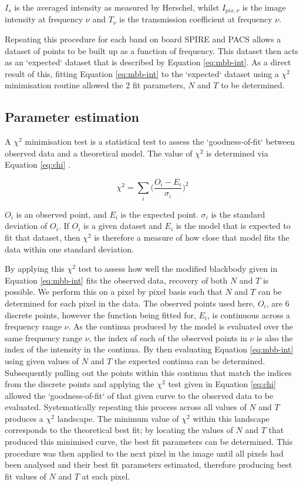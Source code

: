 \documentclass{report}
\begin{document}
$I_{s}$ is the averaged intensity as measured by Herschel, whilst $I_{pix,\nu}$ is the image intensity at frequency $\nu$ and $T_{\nu}$ is the transmission coefficient at frequency $\nu$.

Repeating this procedure for each band on board SPIRE and PACS allows a dataset of points to be built up as a function of frequency. This dataset then acts as an `expected` dataset that is described by Equation \ref{eq:mbb-int}. As a direct result of this, fitting Equation \ref{eq:mbb-int} to the `expected` dataset using a $\chi^{2}$ minimisation routine allowed the 2 fit parameters, $N$ and $T$ to be determined.

\subsection{Parameter estimation}
A $\chi^{2}$ minimisation test is a statistical test to assess the `goodness-of-fit` between observed data and a theoretical model. The value of $\chi^{2}$ is determined via Equation \ref{eq:chi} \parencite{error}.

\begin{equation}
  \chi^{2} = \sum_{i}\Bigg (\frac{O_{i}-E_{i}}{\sigma_{i}} \Bigg )^{2}
   \label{eq:chi}
\end{equation}

$O_{i}$ is an observed point, and $E_{i}$ is the expected point. $\sigma_{i}$ is the standard deviation of $O_{i}$. If $O_{i}$ is a given dataset and $E_{i}$ is the model that is expected to fit that dataset, then $\chi^{2}$ is therefore a measure of how close that model fits the data within one standard deviation.

By applying this $\chi^{2}$ test to assess how well the modified blackbody given in Equation \ref{eq:mbb-int} fits the observed data, recovery of both $N$ and $T$ is possible. We perform this on a pixel by pixel basis such that $N$ and $T$ can be determined for each pixel in the data. The observed points used here, $O_{i}$, are 6 discrete points, however the function being fitted for, $E_{i}$, is continuous across a frequency range $\nu$. As the continua produced by the model is evaluated over the same frequency range $\nu$, the index of each of the observed points in $\nu$ is also the index of the intensity in the continua. By then evaluating Equation \ref{eq:mbb-int} using given values of $N$ and $T$ the expected continua can be determined. Subsequently pulling out the points within this continua that match the indices from the discrete points and applying the
$\chi^{2}$ test given in Equation \ref{eq:chi} allowed the `goodness-of-fit` of that given curve to the observed data to be evaluated. Systematically repeating this process across all values of $N$ and $T$ produces a $\chi^{2}$ landscape. The minimum value of $\chi^{2}$ within this landscape corresponds to the theoretical best fit; by locating the values of $N$ and $T$ that produced this minimised curve, the best fit parameters can be determined. This procedure was then applied to the next pixel in the image until all pixels had been analysed and their best fit parameters estimated, therefore producing best fit values of $N$ and $T$ at each pixel.
\end{document}
